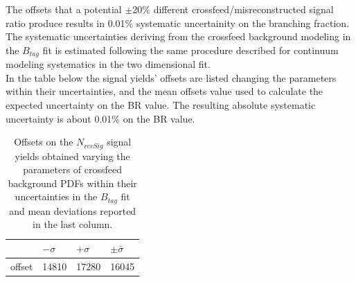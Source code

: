 The offsets that a potential $\pm$20$\%$ different crossfeed/misreconstructed signal ratio produce results in 0.01$\%$ systematic
uncertainity on the branching fraction.
\\
The systematic uncertainties deriving from the crossfeed background modeling in the $B_{tag}$ fit is estimated following 
the same procedure  described for continuum modeling systematics in the two dimensional fit.\\
In the table below the signal yields' offsets are listed changing
the parameters within their uncertainties, and the mean offsets value used to calculate the
expected uncertainty on the BR value. The resulting absolute systematic uncertainty is
about 0.01$\%$ on the BR value.
\vspace{0.25 cm}
\begin{table}[H]
\begin{tabular}{ |p{2.5cm}||p{2cm}| p{2cm}|  p{2cm}|}
\hline
       &  $- \sigma$ &  $+ \sigma$ & $ \pm \bar{\sigma}$\\
 \hline
 offset    &  14810 &  17280 & 16045 \\
 \hline
\end{tabular}
\caption{Offsets on the $N_{recSig}$  signal yields  obtained varying the parameters of crossfeed
background PDFs within their uncertainties in the $B_{tag}$ fit and mean
deviations reported in the last column. }
\end{table}

\begin{table}[h]
    \centering
    \caption{Systematic uncertainties in the determination of the  $B^+ \rightarrow \bar{\Lambda}_c^- X$ branching fraction in \si{\percent}.}
    \label{tab:systematics:ChargedCorr}
    \end{table}
    

